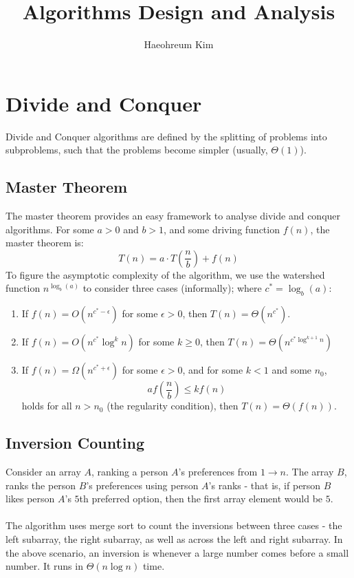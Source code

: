 \documentclass[journal, letterpaper]{IEEEtran}
\begin{document}
	\title{Algorithms Design and Analysis}
	\author{Haeohreum Kim}
	\maketitle


  \section{Divide and Conquer}
  Divide and Conquer algorithms are defined by the splitting of problems into subproblems, such that the problems
  become simpler (usually, $\Theta(1)$).
  \subsection{Master Theorem}
  The master theorem provides an easy framework to analyse divide and conquer algorithms. For some $a > 0$ and $b > 1$,
  and some driving function $f(n)$, the master theorem is: \[ T(n) = a \cdot T(\frac{n}{b}) + f(n)\]
  To figure the asymptotic complexity of the algorithm, we use the watershed function $n^{\log_b(a)}$ to consider
  three cases (informally); where $c^* = \log_b(a)$:
  \begin{enumerate}
    \item If $f(n) = O(n^{c^* - \epsilon})$ for some $\epsilon > 0$, then $T(n) = \Theta(n^{c^*})$.
    \item If $f(n) = O(n^{c^*}\log^k n)$ for some $k \ge 0$, then $T(n) = \Theta(n^{c^*\log^{k+1}n})$
    \item If $f(n) = \Omega(n^{c^* + \epsilon})$ for some $\epsilon > 0$, and for some $k < 1$ and some $n_0$,
      \[ af(\frac{n}{b}) \le kf(n)\]
      holds for all $n > n_0$ (the regularity condition), then $T(n) = \Theta(f(n))$.
  \end{enumerate}
  \subsection{Inversion Counting}
  Consider an array
  $A$, ranking a person $A$'s preferences from $1 \to n$. The array $B$, ranks the person $B$'s preferences using
  person $A$'s ranks - that is, if person $B$ likes person $A$'s $5$th preferred option, then the first array
  element would be $5$. \\ \\ 
  The algorithm uses merge sort to count the inversions between three cases - the left subarray, the right subarray,
  as well as across the left and right subarray. In the above scenario, an inversion is whenever a large number
  comes before a small number. It runs in $\Theta(n \log n)$ time.
\end{document}
